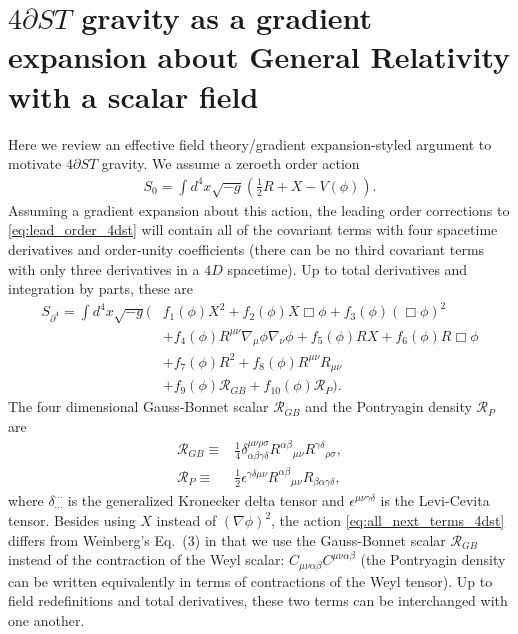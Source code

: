\documentclass{ws-ijmpd}
\begin{document}
\section{$4\partial ST$ gravity as a gradient expansion about 
   General Relativity with a scalar field
   \label{sec:4dst_gradient_expansion}
}
   Here we review an effective field theory/gradient expansion-styled 
argument to motivate $4\partial ST$ 
gravity\cite{Weinberg:2008hq,Kovacs:2020pns,Kovacs:2020ywu}.
We assume a zeroeth order action
\begin{align}
\label{eq:lead_order_4dst}
   S_0
   =
   \int d^4x\sqrt{-g}\left(
      \frac{1}{2}R
      +
      X
      -
      V\left(\phi\right)
   \right)
   .
\end{align}
Assuming a gradient expansion about this action,
the leading order corrections to \eqref{eq:lead_order_4dst}
will contain all of the covariant terms with four spacetime derivatives
and order-unity coefficients (there can be no third covariant terms
with only three derivatives in a $4D$ spacetime).
Up to total derivatives and integration by parts, these are
\begin{align}
\label{eq:all_next_terms_4dst}
   S_{\partial^4}
   =
   \int d^4x\sqrt{-g}\Big(
      &
      f_1\left(\phi\right)X^2
      +
      f_2\left(\phi\right)X\Box\phi
      +
      f_3\left(\phi\right)\left(\Box\phi\right)^2
      \nonumber\\
      &+
      f_4\left(\phi\right)R^{\mu\nu}\nabla_{\mu}\phi\nabla_{\nu}\phi
      +
      f_5\left(\phi\right)RX
      +
      f_6\left(\phi\right)R\Box\phi
      \nonumber\\
      &+
      f_7\left(\phi\right)R^2
      +
      f_8\left(\phi\right)R^{\mu\nu}R_{\mu\nu}
      \nonumber\\
      &+
      f_9\left(\phi\right)\mathcal{R}_{GB}
      +
      f_{10}\left(\phi\right)\mathcal{R}_{P}
   \Big)
   .
\end{align}
The four dimensional Gauss-Bonnet scalar $\mathcal{R}_{GB}$ and the
Pontryagin density $\mathcal{R}_{P}$ are
\begin{align}
   \mathcal{R}_{GB}
   \equiv&
   \frac{1}{4}\delta^{\mu\nu\rho\sigma}_{\alpha\beta\gamma\delta}
   R^{\alpha\beta}{}_{\mu\nu}
   R^{\gamma\delta}{}_{\rho\sigma}
   ,\\ 
   \mathcal{R}_{P}
   \equiv&
   \frac{1}{2}
   \epsilon^{\gamma\delta\mu\nu}
   R^{\alpha\beta}{}_{\mu\nu}
   R_{\beta\alpha\gamma\delta}
   ,
\end{align}
where $\delta^{\cdots}_{\cdots}$ is the generalized Kronecker delta
tensor and $\epsilon^{\mu\nu\gamma\delta}$ is the Levi-Cevita tensor.
Besides using $X$ instead of $\left(\nabla\phi\right)^2$, the action
\eqref{eq:all_next_terms_4dst} differs from Weinberg's\cite{Weinberg:2008hq}
Eq.~(3) in that we use the Gauss-Bonnet scalar $\mathcal{R}_{GB}$ instead
of the contraction of the Weyl scalar:
$C_{\mu\nu\alpha\beta}C^{\mu\nu\alpha\beta}$
(the Pontryagin density can be written equivalently in terms
of contractions of the Weyl tensor\cite{Grumiller:2007rv}).
Up to field redefinitions and total derivatives, 
these two terms can be interchanged with one 
another\cite{Kovacs:2020pns,Kovacs:2020ywu}.
\end{document}
